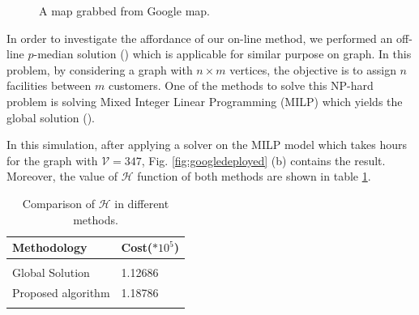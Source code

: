 \documentclass[twocolumn]{svjour3}       %
\begin{document}
\begin{figure}[h]
	\centering	
	\caption{A map grabbed from Google map.}
	\label{fig:googlemap}
\end{figure}
%

In order to investigate the affordance of our on-line method, we performed an off-line $p$-median solution (\cite{Daskin2015}) which is applicable for similar purpose on graph. In this problem, by considering a graph with $n \times m$ vertices, the objective is to assign $n$ facilities between $m$ customers. One of the methods to solve this NP-hard problem is solving Mixed Integer Linear Programming (MILP) which yields the global solution (\cite{Edson2005}).

In this simulation, after applying a solver on the MILP model which takes hours for the graph with $\mathcal{V}=347$, Fig. \ref{fig:googledeployed} (b) contains the result. Moreover, the value of $\mathcal{H}$ function of both methods are shown in table \ref{tbl:comparison}.

\begin{table}[t]
\centering
\caption{Comparison of $\mathcal{H}$ in different methods. }
\label{tbl:comparison}
\begin{tabular}{m{3cm}m{1.2cm}}
Methodology    & Cost($*10^5$)    \\
 \hline\\
 Global Solution   &  1.12686  \\
Proposed algorithm & 1.18786  \\
\hline\\
\end{tabular}
\end{table}
\end{document}
